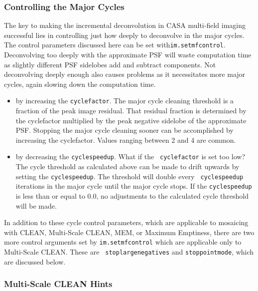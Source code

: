\subsubsection{Controlling the Major Cycles}
\label{section:imtool.mosaic.details.cycles}

The key to making the incremental deconvolution in CASA multi-field
imaging successful lies in controlling just how deeply to deconvolve
in the major cycles.  The control parameters discussed here can be set
with{\tt im.setmfcontrol}.  Deconvolving too deeply with the
approximate PSF will waste computation time as slightly different PSF
sidelobes add and subtract components.  Not deconvolving deeply enough
also causes problems as it necessitates more major cycles, again
slowing down the computation time.

\begin{itemize}
  \item by increasing the {\tt cyclefactor}.  The major cycle cleaning
        threshold is a fraction of the peak image residual.  That
        residual fraction is determined by the cyclefactor multiplied
        by the peak negative sidelobe of the approximate PSF.
        Stopping the major cycle cleaning sooner can be accomplished
        by increasing the cyclefactor.  Values ranging between 2 and 4
        are common.

   \item by decreasing the {\tt cyclespeedup}. What if the {\tt
         cyclefactor} is set too low? The cycle threshold as
         calculated above can be made to drift upwards by setting the
         {\tt cyclespeedup}.  The threshold will double every {\tt
         cyclespeedup} iterations in the major cycle until the major
         cycle stops.  If the {\tt cyclespeedup} is less than or equal
         to 0.0, no adjustments to the calculated cycle threshold will
         be made.
\end{itemize}

In addition to these cycle control parameters, which are applicable to
mosaicing with CLEAN, Multi-Scale CLEAN, MEM, or Maximum Emptiness,
there are two more control arguments set by {\tt im.setmfcontrol}
which are applicable only to Multi-Scale CLEAN.  These are {\tt
stoplargenegatives} and {\tt stoppointmode}, which are discussed
below.

\subsubsection{Multi-Scale CLEAN Hints}
\label{section:imtool.mosaic.details.msclean}

